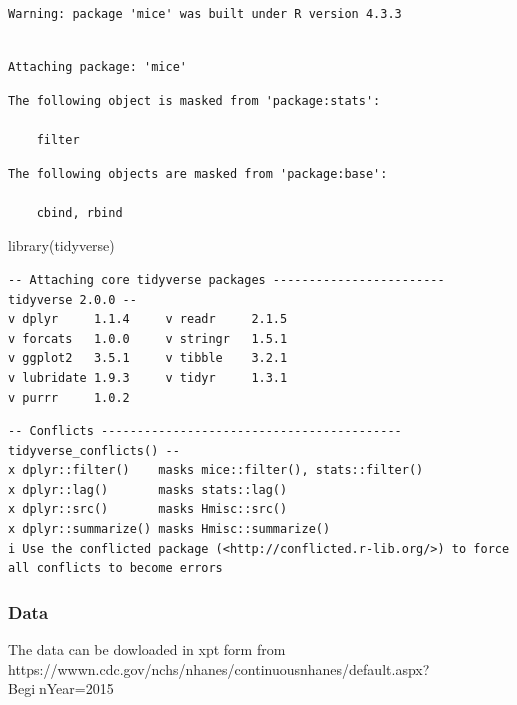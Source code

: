 \documentclass[
  letterpaper,
  DIV=11,
  numbers=noendperiod]{scrartcl}
\newenvironment{Shaded}{\begin{snugshade}}{\end{snugshade}}
\newcommand{\FunctionTok}[1]{\textcolor[rgb]{0.28,0.35,0.67}{#1}}
\newcommand{\NormalTok}[1]{\textcolor[rgb]{0.00,0.23,0.31}{#1}}
\begin{document}
\begin{verbatim}
Warning: package 'mice' was built under R version 4.3.3
\end{verbatim}

\begin{verbatim}

Attaching package: 'mice'
\end{verbatim}

\begin{verbatim}
The following object is masked from 'package:stats':

    filter
\end{verbatim}

\begin{verbatim}
The following objects are masked from 'package:base':

    cbind, rbind
\end{verbatim}

\begin{Shaded}
\begin{Highlighting}[]
\FunctionTok{library}\NormalTok{(tidyverse)}
\end{Highlighting}
\end{Shaded}

\begin{verbatim}
-- Attaching core tidyverse packages ------------------------ tidyverse 2.0.0 --
v dplyr     1.1.4     v readr     2.1.5
v forcats   1.0.0     v stringr   1.5.1
v ggplot2   3.5.1     v tibble    3.2.1
v lubridate 1.9.3     v tidyr     1.3.1
v purrr     1.0.2     
\end{verbatim}

\begin{verbatim}
-- Conflicts ------------------------------------------ tidyverse_conflicts() --
x dplyr::filter()    masks mice::filter(), stats::filter()
x dplyr::lag()       masks stats::lag()
x dplyr::src()       masks Hmisc::src()
x dplyr::summarize() masks Hmisc::summarize()
i Use the conflicted package (<http://conflicted.r-lib.org/>) to force all conflicts to become errors
\end{verbatim}

\hypertarget{data}{%
\subsubsection{Data}\label{data}}

The data can be dowloaded in xpt form from
https://wwwn.cdc.gov/nchs/nhanes/continuousnhanes/default.aspx?BeginYear=2015
\end{document}
